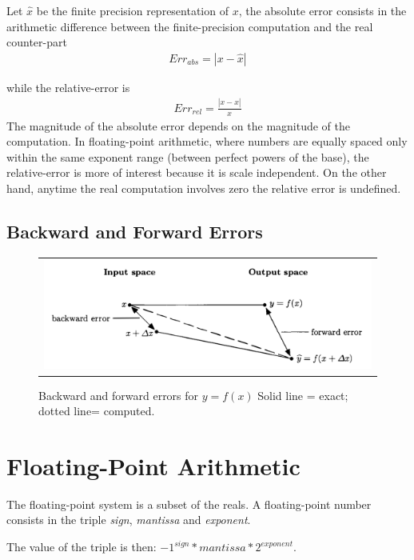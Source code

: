 Let $\widehat{x}$ be the finite precision representation of $x$, the absolute error consists in the arithmetic difference between the finite-precision computation and the real counter-part
%
\begin{align}
Err_{abs}=|x-\widehat{x}|\nonumber
\end{align}
%

while the relative-error is 
%
\begin{align}
Err_{rel}=\frac{|x-\widehat{x}|}{x}\nonumber
\end{align}
%
The magnitude of the absolute error depends on the magnitude of the computation.
%
In floating-point arithmetic, where numbers are equally spaced only within the same exponent range (between perfect powers of the base), the relative-error is more of interest because it is scale independent.
%
On the other hand, anytime the real computation involves zero the relative error is undefined.
%
\subsection{Backward and Forward Errors}
\begin{figure}[h!]
	\centering
	\begin{tabular}{l}
		\includegraphics[width=1.0\textwidth]{pic/forwback.png}
	\end{tabular}
	\caption{Backward and forward errors for $y=f(x)$ Solid line = exact; dotted line= computed.}
	\label{fig:backwardforward}
\end{figure}
\section{Floating-Point Arithmetic}
%
The floating-point system is a subset of the reals.
%
A floating-point number consists in the triple \emph{sign}, \emph{mantissa} and \emph{exponent}.
%

The value of the triple is then: $-1^{sign}*mantissa*2^{exponent}$.
%


